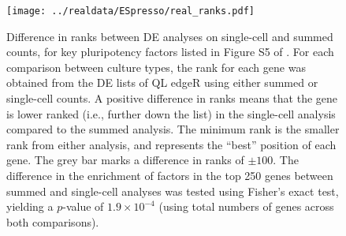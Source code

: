 \documentclass{article}
\newcommand\revised[1]{\textcolor{red}{#1}}
\begin{document}


\begin{figure}[p]
\begin{center}
    \texttt{[image: ../realdata/ESpresso/real\_ranks.pdf]}
\end{center}
\caption{
    Difference in ranks between DE analyses on single-cell and summed counts, for key pluripotency factors listed in Figure S5 of \cite{kolod2015single}.
    For each comparison between culture types, the rank for each gene was obtained from the DE lists of QL edgeR using either summed or single-cell counts.
    A positive difference in ranks means that the gene is lower ranked (i.e., further down the list) in the single-cell analysis compared to the summed analysis.
    The minimum rank is the smaller rank from either analysis, and represents the ``best'' position of each gene.
    The grey bar marks a difference in ranks of $\pm100$.
    The difference in the enrichment of factors in the top 250 genes between summed and single-cell analyses was tested using Fisher's exact test, yielding a $p$-value of $1.9 \times 10^{-4}$ (using total numbers of genes across both comparisons). 
}
\end{figure}
\end{document}
